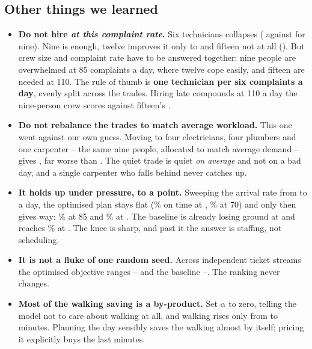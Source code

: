 \documentclass[11pt]{article}
\newcommand{\num}[1]{#1}
\begin{document}
\subsection{Other things we learned}
\begin{itemize}
\item \textbf{Do not hire \emph{at this complaint rate}.} Six technicians
  collapses (\NCrewSixObj{} against \NCrewNineObj{} for nine). Nine is
  enough, twelve improves it only to \NCrewTwelveObj{} and fifteen not at
  all (\NCrewFifteenObj). But crew size and complaint rate have to be
  answered together: nine people are overwhelmed at \num{85} complaints a
  day, where twelve cope easily, and fifteen are needed at \num{110}. The
  rule of thumb is \textbf{one technician per six complaints a day}, evenly
  split across the trades. Hiring late compounds \textemdash{} at
  \num{110} a day the nine-person crew scores
  \NGridOneHundredTenxThreeObj{} against fifteen's
  \NGridOneHundredTenxFiveObj.
\item \textbf{Do not rebalance the trades to match average workload.} This
  one went against our own guess. Moving to four electricians, four plumbers
  and one carpenter -- the same nine people, allocated to match average
  demand -- gives \NCrewRebalObj{}, far worse than \NCrewNineObj{}. The quiet
  trade is quiet \emph{on average} and not on a bad day, and a single
  carpenter who falls behind never catches up.
\item \textbf{It holds up under pressure, to a point.} Sweeping the arrival
  rate from \NLoadMin{} to \NLoadMax{} a day, the optimised plan stays flat
  (\NLoadFortySla\% on time at \NLoadMin, \NLoadSeventySla\% at
  \num{70}) and only then gives way: \NLoadEightyFiveSla\% at \num{85}
  and \NLoadHundredSla\% at \NLoadMax. The baseline is already losing
  ground at \NLoadMin{} and reaches \NLoadHundredFifoSla\% at \NLoadMax.
  The knee is sharp, and past it the answer is staffing, not scheduling.
\item \textbf{It is not a fluke of one random seed.} Across \NSeedCount{}
  independent ticket streams the optimised objective ranges
  \NSeedImpMin--\NSeedImpMax{} and the baseline \NSeedFifoMin--\NSeedFifoMax{}.
  The ranking never changes.
\item \textbf{Most of the walking saving is a by-product.} Set $\alpha$ to
  zero, telling the model not to care about walking at all, and walking rises
  only from \NImpTravel{} to \NAlphaZeroTravel{} minutes. Planning the day
  sensibly saves the walking almost by itself; pricing it explicitly buys the
  last \NAlphaWorthMinutes{} minutes.
\end{itemize}
\end{document}
